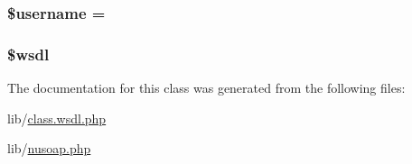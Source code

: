 \subsubsection[{\$username}]{\setlength{\rightskip}{0pt plus 5cm}\$username = \textquotesingle{}\textquotesingle{}}\label{classwsdl_a0eb82aa5f81cf845de4b36cd653c42cf}
\hypertarget{classwsdl_a8b3fb8293ad64e3dc0b814fedf24c5dd}{}
\subsubsection[{\$wsdl}]{\setlength{\rightskip}{0pt plus 5cm}\${\bf wsdl}}\label{classwsdl_a8b3fb8293ad64e3dc0b814fedf24c5dd}


The documentation for this class was generated from the following files\+:\begin{DoxyCompactItemize}
\item 
lib/\hyperlink{class_8wsdl_8php}{class.\+wsdl.\+php}\item 
lib/\hyperlink{nusoap_8php}{nusoap.\+php}\end{DoxyCompactItemize}
